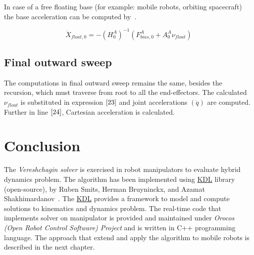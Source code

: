 In case of a free floating base (for example: mobile robots, orbiting spacecraft) the base acceleration can be computed by~\cite{vereshchagin1989modeling}. 

\begin{equation}\label{eq:cartesian-acceleration}
\ddot{X}_{float, 0} = -(H_0^A)^{-1} (F_{bias, 0}^A + A_0^A  \nu_{float})
\end{equation}


\subsection{Final outward sweep}
The computations in final outward sweep remains the same, besides the recursion, which must traverse from root to all the end-effectors. The calculated $\nu_{float}$ is substituted in expression $\ref{23}$ and joint accelerations $(\ddot{q})$ are computed. Further in line $\ref{24}$, Cartesian acceleration is calculated.

\section{Conclusion}
The \textit{Vereshchagin solver} is exercised in robot manipulators to evaluate hybrid dynamics problem. \cite{KDLopensource} The algorithm has been implemented using \hyperref[kdl]{KDL} library (open-source), by Ruben Smits, Herman Bruyninckx, and Azamat Shakhimardanov~\cite{KDLopensource}. The \hyperref[kdl]{KDL} provides a framework to model and compute solutions to kinematics and dynamics problem. The real-time code that implements solver on manipulator is provided and maintained under \textit{Orocos (Open Robot Control Software) Project} and is written in C++ programming language. The approach that extend and apply the algorithm to mobile robots is described in the next chapter. 


